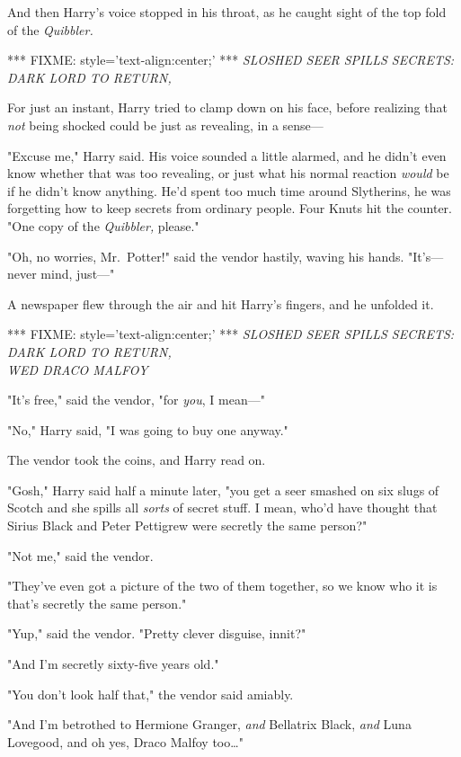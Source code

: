 And then Harry's voice stopped in his throat, as he caught sight of the top 
fold of the \emph{Quibbler.}

*** FIXME: style='text-align:center;' ***
\emph{SLOSHED SEER SPILLS SECRETS:\\
DARK LORD TO RETURN,}

For just an instant, Harry tried to clamp down on his face, before realizing 
that \emph{not} being shocked could be just as revealing, in a sense---

"Excuse me," Harry said. His voice sounded a little alarmed, and he didn't even 
know whether that was too revealing, or just what his normal reaction 
\emph{would} be if he didn't know anything. He'd spent too much time around 
Slytherins, he was forgetting how to keep secrets from ordinary people. Four 
Knuts hit the counter. "One copy of the \emph{Quibbler,} please."

"Oh, no worries, Mr.~Potter!" said the vendor hastily, waving his hands. 
"It's---never mind, just---"

A newspaper flew through the air and hit Harry's fingers, and he unfolded it.

*** FIXME: style='text-align:center;' ***
\emph{SLOSHED SEER SPILLS SECRETS:\\
DARK LORD TO RETURN,\\
WED DRACO MALFOY}

"It's free," said the vendor, "for \emph{you}, I mean---"

"No," Harry said, "I was going to buy one anyway."

The vendor took the coins, and Harry read on.

"Gosh," Harry said half a minute later, "you get a seer smashed on six slugs of 
Scotch and she spills all \emph{sorts} of secret stuff. I mean, who'd have 
thought that Sirius Black and Peter Pettigrew were secretly the same person?"

"Not me," said the vendor.

"They've even got a picture of the two of them together, so we know who it is 
that's secretly the same person."

"Yup," said the vendor. "Pretty clever disguise, innit?"

"And I'm secretly sixty-five years old."

"You don't look half that," the vendor said amiably.

"And I'm betrothed to Hermione Granger, \emph{and} Bellatrix Black, \emph{and} 
Luna Lovegood, and oh yes, Draco Malfoy too{\ldots}"

